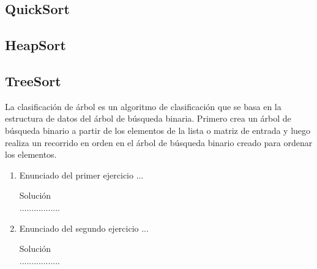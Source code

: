 \documentclass{article}
\begin{document}
    \subsection{QuickSort}
    
    \subsection{HeapSort}
    \subsection{TreeSort}
    La clasificación de árbol es un algoritmo de clasificación que se basa en la estructura de datos del árbol de búsqueda binaria. Primero crea un árbol de búsqueda binario a partir de los elementos de la lista o matriz de entrada y luego realiza un recorrido en orden en el árbol de búsqueda binario creado para ordenar los elementos.
	\begin{enumerate}
		\item Enunciado del primer ejercicio ...
		
		Solución \\
		.................
		
		\item Enunciado del segundo ejercicio ...
		
		Solución \\
		.................
	\end{enumerate}


	
		
	
\end{document}
